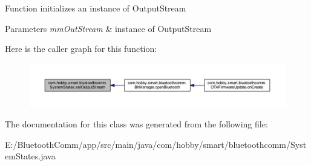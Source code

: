 Function initializes an instance of Output\+Stream 
\begin{DoxyParams}{Parameters}
{\em mm\+Out\+Stream} & instance of Output\+Stream \\
\hline
\end{DoxyParams}
Here is the caller graph for this function\+:\nopagebreak
\begin{figure}[H]
\begin{center}
\leavevmode
\includegraphics[width=350pt]{classcom_1_1hobby_1_1smart_1_1bluetoothcomm_1_1_system_states_a05d853946c36a52b5400482b2b66584a_icgraph}
\end{center}
\end{figure}


The documentation for this class was generated from the following file\+:\begin{DoxyCompactItemize}
\item 
E\+:/\+Bluetooth\+Comm/app/src/main/java/com/hobby/smart/bluetoothcomm/System\+States.\+java\end{DoxyCompactItemize}
